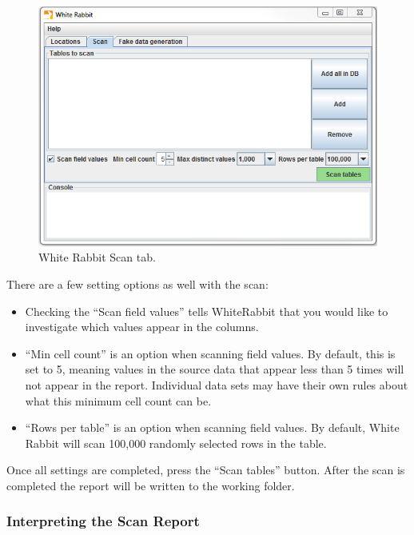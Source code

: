 \documentclass[11pt]{book}
\providecommand{\tightlist}{%
  \setlength{\itemsep}{0pt}\setlength{\parskip}{0pt}}
\theoremstyle{definition}
\theoremstyle{definition}
\theoremstyle{definition}
\theoremstyle{remark}
\begin{document}
\begin{figure}

{\centering \includegraphics[width=1\linewidth]{images/ExtractTransformLoad/WhiteRabbitAddTables} 

}

\caption{White Rabbit Scan tab.}\label{fig:WhiteRabbitAddTables}
\end{figure}

There are a few setting options as well with the scan:

\begin{itemize}
\tightlist
\item
  Checking the ``Scan field values'' tells WhiteRabbit that you would
  like to investigate which values appear in the columns.
\item
  ``Min cell count'' is an option when scanning field values. By
  default, this is set to 5, meaning values in the source data that
  appear less than 5 times will not appear in the report. Individual
  data sets may have their own rules about what this minimum cell count
  can be.
\item
  ``Rows per table'' is an option when scanning field values. By
  default, White Rabbit will scan 100,000 randomly selected rows in the
  table.
\end{itemize}

Once all settings are completed, press the ``Scan tables'' button. After
the scan is completed the report will be written to the working folder.

\subsubsection*{Interpreting the Scan
Report}\label{interpreting-the-scan-report}
\end{document}
